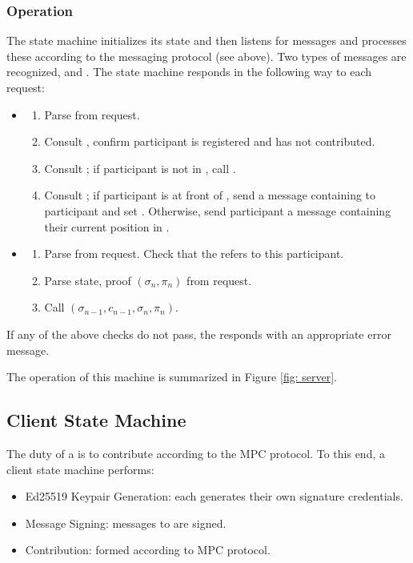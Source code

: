 \subsubsection*{Operation}
The \Coordinator{} state machine initializes its state and then listens for messages and processes these according to the messaging protocol (see above). Two types of messages are recognized, \QueryRequest{} and \UpdateRequest{}. The state machine responds in the following way to each request:
\begin{itemize}
    \item \QueryRequest{}
    \begin{enumerate}
        \item Parse \ParticipantId{} from request. 
        \item Consult \Registry{}, confirm participant is registered and has not contributed. 
        \item Consult \Queue{}; if participant is not in \Queue{}, call \enqueue{}.
        \item Consult \Queue{}; if participant is at front of \Queue{}, send a message containing \MpcState{} to participant and set \TimedLock{}. Otherwise, send participant a message containing their current position in \Queue{}.
    \end{enumerate}
    \item \UpdateRequest{}
    \begin{enumerate}
        \item Parse \ParticipantId{} from request. Check that the \TimedLock{} refers to this participant.
        \item Parse state, proof $(\sigma_n, \pi_n)$ from request. 
        \item Call \update{}$(\sigma_{n-1}, c_{n-1}, \sigma_n, \pi_n)$.
    \end{enumerate}
\end{itemize}
If any of the above checks do not pass, the \Coordinator{} responds with an appropriate error message.

The operation of this machine is summarized in Figure \ref{fig: server}.

\subsection{Client State Machine}

The duty of a \Contributor{} is to contribute according to the MPC protocol. To this end, a client state machine performs:
\begin{itemize}
    \item Ed25519 Keypair Generation: each \Contributor{} generates their own signature credentials.
    \item Message Signing: messages to \Coordinator{} are signed.
    \item Contribution: formed according to MPC protocol.
\end{itemize}

